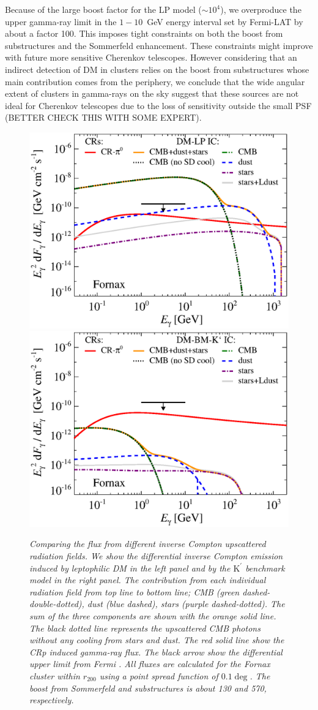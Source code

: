 \documentclass[10pt,aps,pra,reprint,amsmath,amsfonts,amssymb,showpacs]{revtex4-1}
\newcommand{\rmn}{\mathrm}
\newcommand{\Kp}{\rmn{K}^\prime}
\newcommand{\rvir}{r_{200}}
\begin{document}
Because of the large boost factor for the LP model ($\sim 10^4$), we
overproduce the upper gamma-ray limit in the $1-10$~GeV energy
interval set by Fermi-LAT by about a factor 100. This imposes tight
constraints on both the boost from substructures and the Sommerfeld
enhancement. These constraints might improve with future more
sensitive Cherenkov telescopes. However considering that an indirect
detection of DM in clusters relies on the boost from substructures
whose main contribution comes from the periphery, we conclude that the
wide angular extent of clusters in gamma-rays on the sky suggest that
these sources are not ideal for Cherenkov telescopes due to the loss
of sensitivity outside the small PSF (BETTER CHECK THIS WITH SOME
EXPERT).

\begin{figure}
\begin{minipage}{2.0\columnwidth}
\includegraphics[width=0.49\columnwidth]{figures/flux.IRcomp.v11.0.1deg.1.6T.SubMass.elmu.SF300.noMW.woGal.eps}
\includegraphics[width=0.49\columnwidth]{figures/flux.IRcomp.BMv11.0.1deg.SubMass.noMW.woGal.eps}
\caption{\it Comparing the flux from different inverse Compton
  upscattered radiation fields. We show the differential inverse
  Compton emission induced by leptophilic DM in the left panel and by
  the $\Kp$ benchmark model in the right panel. The contribution from
  each individual radiation field from top line to bottom line; CMB
  (green dashed-double-dotted), dust (blue dashed), stars (purple
  dashed-dotted). The sum of the three components are shown with the
  orange solid line. The black dotted line represents the upscattered
  CMB photons without any cooling from stars and dust. The red solid
  line show the CRp induced gamma-ray flux. The black arrow show the
  differential upper limit from Fermi \cite{2010ApJ...717L..71A}. All
  fluxes are calculated for the Fornax cluster within $\rvir$ using a
  point spread function of $0.1\deg$. The boost from Sommerfeld and
  substructures is about 130 and 570, respectively.}
 \label{fig:IR_comp}
\end{minipage}
\end{figure}
\end{document}
